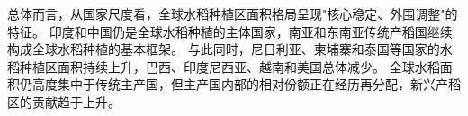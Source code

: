 
    

总体而言，从国家尺度看，全球水稻种植区面积格局呈现"核心稳定、外围调整"的特征。
印度和中国仍是全球水稻种植的主体国家，南亚和东南亚传统产稻国继续构成全球水稻种植的基本框架。
与此同时，尼日利亚、柬埔寨和泰国等国家的水稻种植区面积持续上升，巴西、印度尼西亚、越南和美国总体减少。
全球水稻面积仍高度集中于传统主产国，但主产国内部的相对份额正在经历再分配，新兴产稻区的贡献趋于上升。


